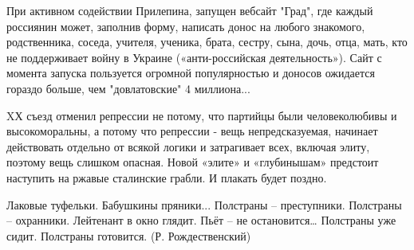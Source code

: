  
 
 
 
 

При активном содействии Прилепина, запущен вебсайт "Град", где каждый россиянин
может, заполнив форму, написать донос на любого знакомого, родственника,
соседа, учителя, ученика, брата, сестру, сына, дочь, отца, мать, кто не
поддерживает войну в Украине («анти-российская деятельность»). Сайт с момента
запуска пользуется огромной популярностью и доносов ожидается гораздо больше,
чем "довлатовские" 4 миллиона...

XХ съезд отменил репрессии не потому, что партийцы были человеколюбивы и
высокоморальны, а потому что репрессии - вещь непредсказуемая, начинает
действовать отдельно от всякой логики и затрагивает всех, включая элиту,
поэтому вещь слишком опасная. Новой «элите» и «глубинышам» предстоит наступить
на ржавые сталинские грабли. И плакать будет поздно. 

Лаковые туфельки. 
\obeycr
Бабушкины пряники...
Полстраны – преступники. 
Полстраны – охранники. 
Лейтенант в окно глядит. 
Пьёт – не остановится… 
Полстраны уже сидит. 
Полстраны готовится. 
\smallskip
(Р. Рождественский)
\restorecr
